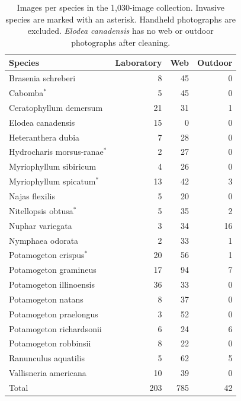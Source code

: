 \documentclass[final,3p,times,twocolumn]{elsarticle}
\begin{document}
\begin{table}[!ht]
    \centering
    \caption{Images per species in the 1{,}030-image collection. Invasive species are marked with an asterisk. Handheld photographs are excluded. \emph{Elodea canadensis} has no web or outdoor photographs after cleaning.}
    \label{tab:data}
    \renewcommand{\arraystretch}{1.1}
    \small
    \begin{tabular}{lrrr}
        \hline
        \textbf{Species} & \textbf{Laboratory} & \textbf{Web} & \textbf{Outdoor} \\
        \hline
        Brasenia schreberi & 8 & 45 & 0 \\
        Cabomba$^{*}$ & 5 & 45 & 0 \\
        Ceratophyllum demersum & 21 & 31 & 1 \\
        Elodea canadensis & 15 & 0 & 0 \\
        Heteranthera dubia & 7 & 28 & 0 \\
        Hydrocharis morsus-ranae$^{*}$ & 2 & 27 & 0 \\
        Myriophyllum sibiricum & 4 & 26 & 0 \\
        Myriophyllum spicatum$^{*}$ & 13 & 42 & 3 \\
        Najas flexilis & 5 & 20 & 0 \\
        Nitellopsis obtusa$^{*}$ & 5 & 35 & 2 \\
        Nuphar variegata & 3 & 34 & 16 \\
        Nymphaea odorata & 2 & 33 & 1 \\
        Potamogeton crispus$^{*}$ & 20 & 56 & 1 \\
        Potamogeton gramineus & 17 & 94 & 7 \\
        Potamogeton illinoensis & 36 & 33 & 0 \\
        Potamogeton natans & 8 & 37 & 0 \\
        Potamogeton praelongus & 3 & 52 & 0 \\
        Potamogeton richardsonii & 6 & 24 & 6 \\
        Potamogeton robbinsii & 8 & 22 & 0 \\
        Ranunculus aquatilis & 5 & 62 & 5 \\
        Vallisneria americana & 10 & 39 & 0 \\
        \hline
        Total & 203 & 785 & 42 \\
        \hline
    \end{tabular}
\end{table}
\end{document}
